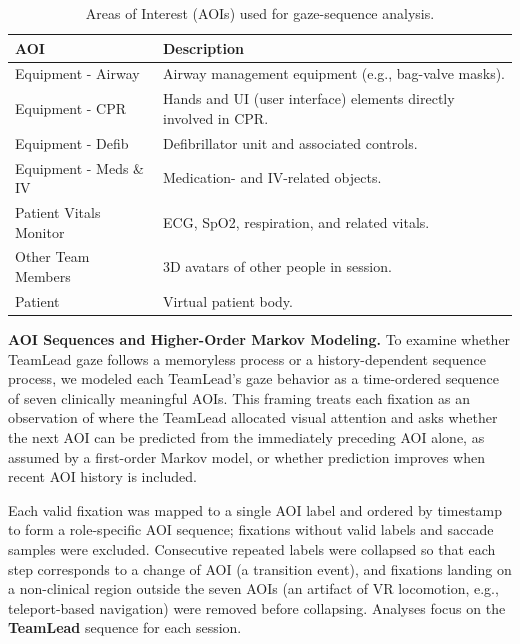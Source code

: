 \documentclass[runningheads]{llncs}
\begin{document}
\begin{table}[t]
\centering
\caption{Areas of Interest (AOIs) used for gaze-sequence analysis.}
\label{tab:AOIs}
\begin{tabular}{ll}
\toprule
\textbf{AOI} & \textbf{Description} \\
\midrule
Equipment - Airway     & Airway management equipment (e.g., bag-valve masks). \\
Equipment - CPR        & Hands and UI (user interface) elements directly involved in CPR. \\
Equipment - Defib      & Defibrillator unit and associated controls. \\
Equipment - Meds \& IV & Medication- and IV-related objects. \\
Patient Vitals Monitor & ECG, SpO2, respiration, and related vitals. \\
Other Team Members     & 3D avatars of other people in session. \\
Patient                & Virtual patient body. \\
\bottomrule
\end{tabular}
\end{table}

\textbf{AOI Sequences and Higher-Order Markov Modeling.} To examine whether TeamLead gaze follows a memoryless process or a history-dependent sequence process, we modeled each TeamLead's gaze behavior as a time-ordered sequence of seven clinically meaningful AOIs. This framing treats each fixation as an observation of where the TeamLead allocated visual attention and asks whether the next AOI can be predicted from the immediately preceding AOI alone, as assumed by a first-order Markov model, or whether prediction improves when recent AOI history is included. 

Each valid fixation was mapped to a single AOI label and ordered by timestamp to form a role-specific AOI sequence; fixations without valid labels and saccade samples were excluded. Consecutive repeated labels were collapsed so that each step corresponds to a change of AOI (a transition event), and fixations landing on a non-clinical region outside the seven AOIs (an artifact of VR locomotion, e.g., teleport-based navigation) were removed before collapsing. Analyses focus on the \textbf{TeamLead} sequence for each session.
\end{document}
